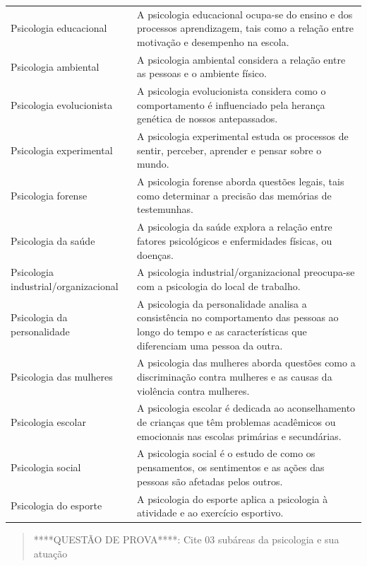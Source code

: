 \documentclass[
]{book}
\begin{document}
\begin{longtable}[]{@{}
  >{\raggedright\arraybackslash}p{}
  >{\raggedright\arraybackslash}p{}@{}}
Psicologia educacional & A psicologia educacional ocupa-se do ensino e dos processos aprendizagem, tais como a relação entre motivação e desempenho na escola. \\
Psicologia ambiental & A psicologia ambiental considera a relação entre as pessoas e o ambiente físico. \\
Psicologia evolucionista & A psicologia evolucionista considera como o comportamento é influenciado pela herança genética de nossos antepassados. \\
Psicologia experimental & A psicologia experimental estuda os processos de sentir, perceber, aprender e pensar sobre o mundo. \\
Psicologia forense & A psicologia forense aborda questões legais, tais como determinar a precisão das memórias de testemunhas. \\
Psicologia da saúde & A psicologia da saúde explora a relação entre fatores psicológicos e enfermidades físicas, ou doenças. \\
Psicologia industrial/organizacional & A psicologia industrial/organizacional preocupa-se com a psicologia do local de trabalho. \\
Psicologia da personalidade & A psicologia da personalidade analisa a consistência no comportamento das pessoas ao longo do tempo e as características que diferenciam uma pessoa da outra. \\
Psicologia das mulheres & A psicologia das mulheres aborda questões como a discriminação contra mulheres e as causas da violência contra mulheres. \\
Psicologia escolar & A psicologia escolar é dedicada ao aconselhamento de crianças que têm problemas acadêmicos ou emocionais nas escolas primárias e secundárias. \\
Psicologia social & A psicologia social é o estudo de como os pensamentos, os sentimentos e as ações das pessoas são afetadas pelos outros. \\
Psicologia do esporte & A psicologia do esporte aplica a psicologia à atividade e ao exercício esportivo. \\
\bottomrule()
\end{longtable}

\begin{quote}
****QUESTÃO DE PROVA****: Cite 03 subáreas da psicologia e sua atuação
\end{quote}
\end{document}
